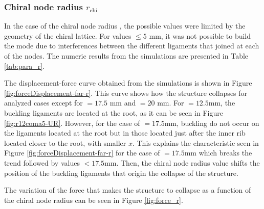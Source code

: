     \clearpage
    \subsubsection{Chiral node radius $r_{\mathrm{chi}}$}

      In the case of the chiral node radius \chir, the possible values were limited by the geometry of the chiral lattice. For values \chir$\le 5$ mm, it was not possible to build the mode due to interferences between the different ligaments that joined at each of the nodes. The numeric results from the simulations are presented in Table \ref{tab:para_r}.

      The displacement-force curve obtained from the simulations is shown in Figure \ref{fig:forceDisplacement-far-r}. This curve shows how the structure collapses for analyzed cases except for \chir$ = 17.5$ mm and \chir$ = 20$ mm. For \chir$= 12.5$mm, the buckling ligaments are located at the root, as it can be seen in Figure \ref{fig:r12coma5-UR}. However, for the case of \chir$= 17.5$mm, buckling do not occur on the ligaments located at the root but in those located just after the inner rib located closer to the root, with smaller $x$. This explains the characteristic seen in Figure \ref{fig:forceDisplacement-far-r} for the case of \chir$= 17.5$mm which breaks the trend followed by values \chir$< 17.5$mm. Then, the chiral node radius \chir value shifts the position of the buckling ligaments that origin the collapse of the structure.

      The variation of the force that makes the structure to collapse as a function of the chiral node radius \chir can be seen in Figure \ref{fig:force_r}.

